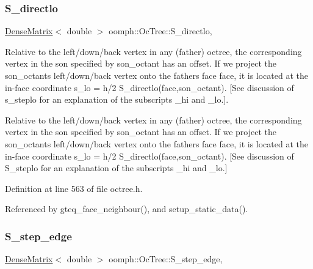 \subsubsection{\texorpdfstring{S\+\_\+directlo}{S\_directlo}}
{\footnotesize\ttfamily \hyperlink{classoomph_1_1DenseMatrix}{Dense\+Matrix}$<$ double $>$ oomph\+::\+Oc\+Tree\+::\+S\+\_\+directlo\hspace{0.3cm}{\ttfamily [static]}, {\ttfamily [private]}}



Relative to the left/down/back vertex in any (father) octree, the corresponding vertex in the son specified by {\ttfamily son\+\_\+octant} has an offset. If we project the son\+\_\+octant\textquotesingle{}s left/down/back vertex onto the father\textquotesingle{}s face {\ttfamily face}, it is located at the in-\/face coordinate {\ttfamily s\+\_\+lo} = h/2 {\ttfamily S\+\_\+directlo(face,son\+\_\+octant)}. \mbox{[}See discussion of {\ttfamily s\+\_\+steplo} for an explanation of the subscripts {\ttfamily \+\_\+hi} and {\ttfamily \+\_\+lo}.\mbox{]}. 

Relative to the left/down/back vertex in any (father) octree, the corresponding vertex in the son specified by {\ttfamily son\+\_\+octant} has an offset. If we project the son\+\_\+octant\textquotesingle{}s left/down/back vertex onto the father\textquotesingle{}s face {\ttfamily face}, it is located at the in-\/face coordinate {\ttfamily s\+\_\+lo} = h/2 {\ttfamily S\+\_\+directlo(face,son\+\_\+octant)}. \mbox{[}See discussion of {\ttfamily S\+\_\+steplo} for an explanation of the subscripts {\ttfamily \+\_\+hi} and {\ttfamily \+\_\+lo}.\mbox{]} 

Definition at line 563 of file octree.\+h.



Referenced by gteq\+\_\+face\+\_\+neighbour(), and setup\+\_\+static\+\_\+data().

\mbox{\label{classoomph_1_1OcTree_a036d7e355507212bee6a53d42adbea26}} 
\subsubsection{\texorpdfstring{S\+\_\+step\+\_\+edge}{S\_step\_edge}}
{\footnotesize\ttfamily \hyperlink{classoomph_1_1DenseMatrix}{Dense\+Matrix}$<$ double $>$ oomph\+::\+Oc\+Tree\+::\+S\+\_\+step\+\_\+edge\hspace{0.3cm}{\ttfamily [static]}, {\ttfamily [private]}}



